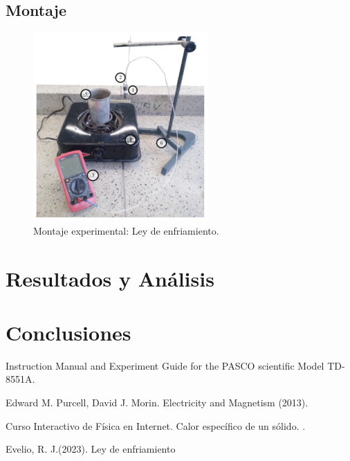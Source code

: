 \documentclass{article}
\begin{document}
\subsection{Montaje}
\begin{figure}[H]
    \centering
    \includegraphics{media/Montaje.png}
    \caption{Montaje experimental: Ley de enfriamiento.}
    
\end{figure}
\section{Resultados y Análisis}


\section{Conclusiones}

\begin{thebibliography}{X}

 Instruction Manual and Experiment Guide for the PASCO scientific Model TD-8551A. 

 Edward M. Purcell, David J. Morin. Electricity and Magnetism (2013).

 Curso Interactivo de Física en Internet. Calor específico de un sólido. . 

 Evelio, R. J.(2023). Ley de enfriamiento

\end{thebibliography}
\end{document}
